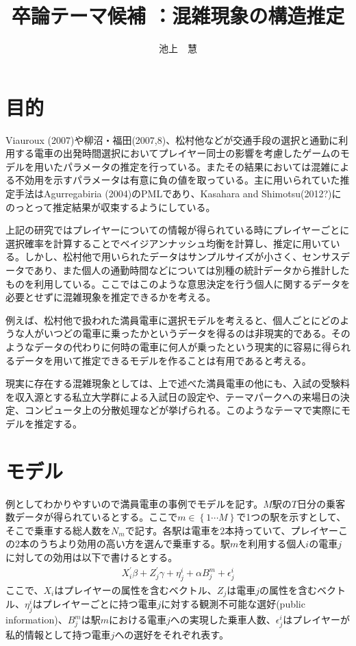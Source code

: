 \documentclass{jsarticle}
\begin{document}
\title{卒論テーマ候補 ：混雑現象の構造推定}
\author{池上　慧}
\maketitle

\section{目的}
Viauroux (2007)や柳沼・福田(2007,8)、松村他などが交通手段の選択と通勤に利用する電車の出発時間選択においてプレイヤー同士の影響を考慮したゲームのモデルを用いたパラメータの推定を行っている。またその結果においては混雑による不効用を示すパラメータは有意に負の値を取っている。主に用いられていた推定手法はAgurregabiria (2004)のPMLであり、Kasahara and Shimotsu(2012?)にのっとって推定結果が収束するようにしている。

上記の研究ではプレイヤーについての情報が得られている時にプレイヤーごとに選択確率を計算することでベイジアンナッシュ均衡を計算し、推定に用いている。しかし、松村他で用いられたデータはサンプルサイズが小さく、センサスデータであり、また個人の通勤時間などについては別種の統計データから推計したものを利用している。ここではこのような意思決定を行う個人に関するデータを必要とせずに混雑現象を推定できるかを考える。

例えば、松村他で扱われた満員電車に選択モデルを考えると、個人ごとにどのような人がいつどの電車に乗ったかというデータを得るのは非現実的である。そのようなデータの代わりに何時の電車に何人が乗ったという現実的に容易に得られるデータを用いて推定できるモデルを作ることは有用であると考える。

現実に存在する混雑現象としては、上で述べた満員電車の他にも、入試の受験料を収入源とする私立大学群による入試日の設定や、テーマパークへの来場日の決定、コンピュータ上の分散処理などが挙げられる。このようなテーマで実際にモデルを推定する。

\section{モデル}
例としてわかりやすいので満員電車の事例でモデルを記す。$M$駅の$T$日分の乗客数データが得られているとする。ここで$m \in \left\{1\cdots M \right\}$で1つの駅を示すとして、そこで乗車する総人数を$N_m$で記す。各駅は電車を$2$本持っていて、プレイヤーこの$2$本のうちより効用の高い方を選んで乗車する。駅$m$を利用する個人$i$の電車$j$に対しての効用は以下で書けるとする。
\begin{align*}
	X_i^{'}\beta + Z_j^{'}\gamma + \eta_j^i + \alpha B_j^m + \epsilon_j^i
\end{align*}
ここで、$X_i$はプレイヤーの属性を含むベクトル、$Z_j$は電車$j$の属性を含むベクトル、$\eta_j^i$はプレイヤーごとに持つ電車$j$に対する観測不可能な選好(public information)、$B_j^m$は駅$m$における電車$j$への実現した乗車人数、$\epsilon_j^i$はプレイヤーが私的情報として持つ電車$j$への選好をそれぞれ表す。
\end{document}
